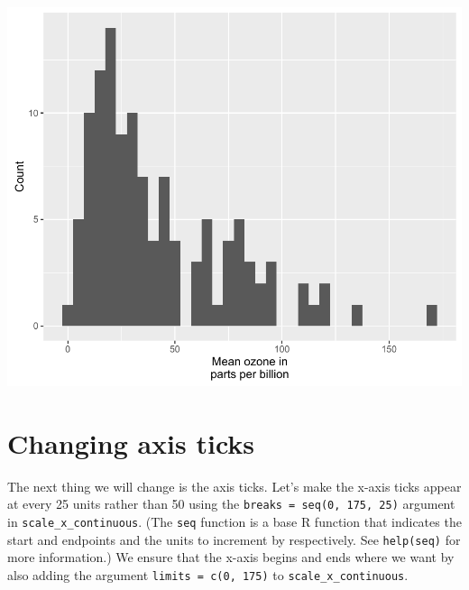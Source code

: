 \begin{center}\includegraphics[width=0.6\linewidth]{7_Histograms_pdf/histogram_6-1} \end{center}

\section{Changing axis ticks}\label{changing-axis-ticks}

The next thing we will change is the axis ticks. Let's make the x-axis
ticks appear at every 25 units rather than 50 using the
\texttt{breaks\ =\ seq(0,\ 175,\ 25)} argument in
\texttt{scale\_x\_continuous}. (The \texttt{seq} function is a base R
function that indicates the start and endpoints and the units to
increment by respectively. See \texttt{help(seq)} for more information.)
We ensure that the x-axis begins and ends where we want by also adding
the argument \texttt{limits\ =\ c(0,\ 175)} to
\texttt{scale\_x\_continuous}.

\begin{Shaded}
\begin{Highlighting}[]
\StringTok{ }\NormalTok{(} \StringTok{ }
\StringTok{  }\NormalTok{(}\NormalTok{(}  \NormalTok{) +}
\StringTok{  }\NormalTok{(} \NormalTok{,}
     \NormalTok{(}\NormalTok{, }\NormalTok{, }\NormalTok{), }\NormalTok{(}\NormalTok{, }\NormalTok{)) +}
\StringTok{  }\NormalTok{(} \NormalTok{)}
\end{Highlighting}
\end{Shaded}

